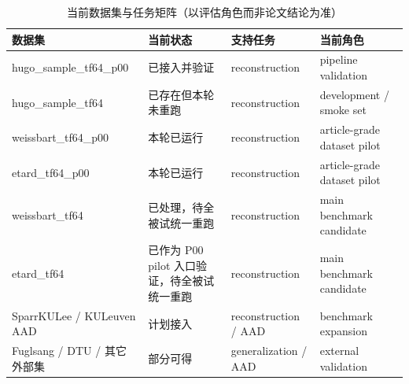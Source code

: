 \begin{table}[ht]
\centering
\caption{当前数据集与任务矩阵（以评估角色而非论文结论为准）}
\begin{tabular}{llll}
\toprule
数据集 & 当前状态 & 支持任务 & 当前角色 \\
\midrule
hugo\_sample\_tf64\_p00 & 已接入并验证 & reconstruction & pipeline validation \\
hugo\_sample\_tf64 & 已存在但本轮未重跑 & reconstruction & development / smoke set \\
weissbart\_tf64\_p00 & 本轮已运行 & reconstruction & article-grade dataset pilot \\
etard\_tf64\_p00 & 本轮已运行 & reconstruction & article-grade dataset pilot \\
weissbart\_tf64 & 已处理，待全被试统一重跑 & reconstruction & main benchmark candidate \\
etard\_tf64 & 已作为 P00 pilot 入口验证，待全被试统一重跑 & reconstruction & main benchmark candidate \\
SparrKULee / KULeuven AAD & 计划接入 & reconstruction / AAD & benchmark expansion \\
Fuglsang / DTU / 其它外部集 & 部分可得 & generalization / AAD & external validation \\
\bottomrule
\end{tabular}
\end{table}
